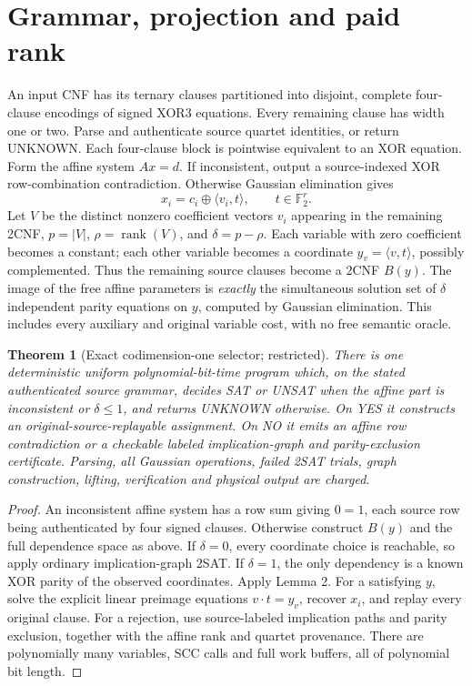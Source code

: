 \documentclass[11pt]{article}
\newtheorem{theorem}{Theorem}
\begin{document}
\section{Grammar, projection and paid rank}
An input CNF has its ternary clauses partitioned into disjoint, complete four-clause encodings of signed XOR3 equations. Every remaining clause has width one or two. Parse and authenticate source quartet identities, or return UNKNOWN. Each four-clause block is pointwise equivalent to an XOR equation. Form the affine system \(Ax=d\). If inconsistent, output a source-indexed XOR row-combination contradiction. Otherwise Gaussian elimination gives
\[
x_i=c_i\oplus\langle v_i,t\rangle,\qquad t\in\mathbb F_2^r.
\]
Let \(V\) be the distinct nonzero coefficient vectors \(v_i\) appearing in the remaining 2CNF, \(p=|V|\), \(\rho=\operatorname{rank}(V)\), and \(\delta=p-\rho\). Each variable with zero coefficient becomes a constant; each other variable becomes a coordinate \(y_v=\langle v,t\rangle\), possibly complemented. Thus the remaining source clauses become a 2CNF \(B(y)\). The image of the free affine parameters is \emph{exactly} the simultaneous solution set of \(\delta\) independent parity equations on \(y\), computed by Gaussian elimination. This includes every auxiliary and original variable cost, with no free semantic oracle.
\begin{theorem}[Exact codimension-one selector; restricted]
There is one deterministic uniform polynomial-bit-time program which, on the stated authenticated source grammar, decides SAT or UNSAT when the affine part is inconsistent or \(\delta\le1\), and returns UNKNOWN otherwise. On YES it constructs an original-source-replayable assignment. On NO it emits an affine row contradiction or a checkable labeled implication-graph and parity-exclusion certificate. Parsing, all Gaussian operations, failed 2SAT trials, graph construction, lifting, verification and physical output are charged.
\end{theorem}
\begin{proof}
An inconsistent affine system has a row sum giving \(0=1\), each source row being authenticated by four signed clauses. Otherwise construct \(B(y)\) and the full dependence space as above. If \(\delta=0\), every coordinate choice is reachable, so apply ordinary implication-graph 2SAT. If \(\delta=1\), the only dependency is a known XOR parity of the observed coordinates. Apply Lemma 2. For a satisfying \(y\), solve the explicit linear preimage equations \(v\cdot t=y_v\), recover \(x_i\), and replay every original clause. For a rejection, use source-labeled implication paths and parity exclusion, together with the affine rank and quartet provenance. There are polynomially many variables, SCC calls and full work buffers, all of polynomial bit length.
\end{proof}
\end{document}
